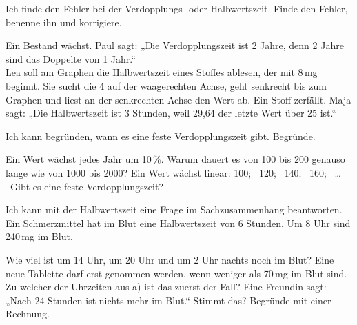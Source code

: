 \begin{aufgabe}{Ich finde den Fehler bei der Verdopplungs- oder Halbwertszeit.}
Finde den Fehler, benenne ihn und korrigiere.
\begin{teile}
\teil Ein Bestand wächst. Paul sagt: „Die Verdopplungszeit ist 2 Jahre, denn 2 Jahre sind das Doppelte von 1 Jahr.“ \\ 
\teil Lea soll am Graphen die Halbwertszeit eines Stoffes ablesen, der mit 8\,mg beginnt. Sie sucht die 4 auf der waagerechten Achse, geht senkrecht bis zum Graphen und liest an der senkrechten Achse den Wert ab.
\teil Ein Stoff zerfällt. Maja sagt: „Die Halbwertszeit ist 3 Stunden, weil 29,64 der letzte Wert über 25 ist.“ \\ 
\end{teile}
\end{aufgabe}

\begin{aufgabe}{Ich kann begründen, wann es eine feste Verdopplungszeit gibt.}
Begründe.
\begin{teile}
\teil Ein Wert wächst jedes Jahr um 10\,\%. Warum dauert es von 100 bis 200 genauso lange wie von 1000 bis 2000?
\teil Ein Wert wächst linear: 100; \ 120; \ 140; \ 160; \ … \ Gibt es eine feste Verdopplungszeit?
\end{teile}
\end{aufgabe}

\begin{aufgabe}{Ich kann mit der Halbwertszeit eine Frage im Sachzusammenhang beantworten.}
Ein Schmerzmittel hat im Blut eine Halbwertszeit von 6 Stunden. Um 8 Uhr sind 240\,mg im Blut.
\begin{teile}
\teil Wie viel ist um 14 Uhr, um 20 Uhr und um 2 Uhr nachts noch im Blut?
\teil Eine neue Tablette darf erst genommen werden, wenn weniger als 70\,mg im Blut sind. Zu welcher der Uhrzeiten aus a) ist das zuerst der Fall?
\teil Eine Freundin sagt: „Nach 24 Stunden ist nichts mehr im Blut.“ Stimmt das? Begründe mit einer Rechnung.
\end{teile}
\end{aufgabe}
